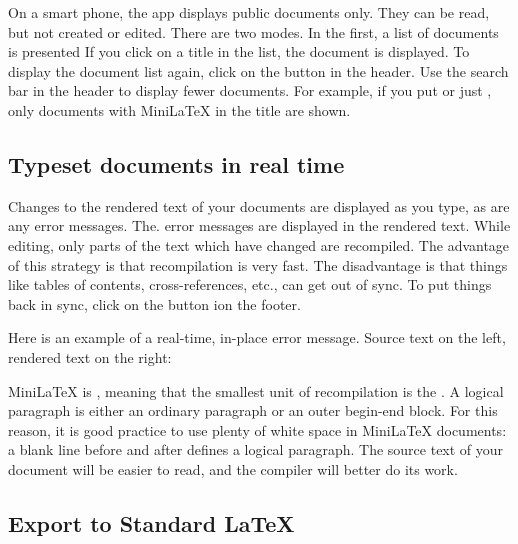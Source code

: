 



On a smart phone, the app displays public documents only.  They can be read, but not created or edited.  There are two modes.  In the first, a list of documents is presented If you click on a title in the list, the document is displayed. To display the document list again, click on the  button in the header. Use the search bar in the header to display fewer documents.  For example, if you put  or just , only documents with MiniLaTeX in the title are shown.


\subsection{Typeset documents in real time}

Changes to the rendered text of your documents are displayed as you type, as are any error messages.  The. error messages are displayed in the rendered text.  While editing, only parts of the text which have changed are recompiled.  The advantage of this strategy  is that recompilation is very fast.  The disadvantage is that things like tables of contents, cross-references, etc., can get out of sync.  To put things back in sync, click on the  button ion the footer.

Here is an example of a real-time, in-place error message.  Source text on the left, rendered text on the right:


 MiniLaTeX is , meaning that the smallest unit of recompilation is the .  A logical paragraph is either an ordinary paragraph or an outer begin-end block.  For this reason, it is good practice to use plenty of white space in MiniLaTeX documents: a blank line before and after defines a logical paragraph.  The source text of your document will be easier to read, and the compiler will better do its work.

\subsection{Export to Standard LaTeX}

